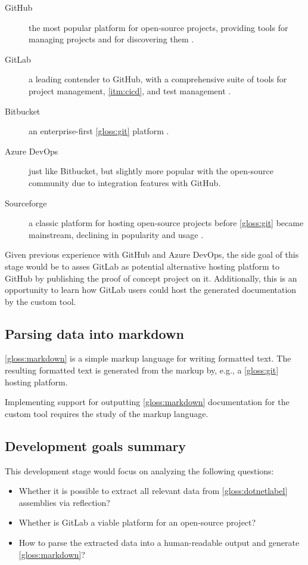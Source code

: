 \begin{description}
    \item[GitHub] the most popular platform for open-source projects, providing tools for managing projects and for discovering them \cite{gumster_6_2018}.
    \item[GitLab] a leading contender to GitHub, with a comprehensive suite of tools for project management, \ref{itm:cicd}, and test management \cite{gumster_6_2018}.
    \item[Bitbucket] an enterprise-first \ref{gloss:git} platform \cite{gumster_6_2018}.
    \item[Azure DevOps] just like Bitbucket, but slightly more popular with the open-source community due to integration features with GitHub.
    \item[Sourceforge] a classic platform for hosting open-source projects before \ref{gloss:git} became mainstream, declining in popularity and usage \cite{gumster_6_2018}.
\end{description}

Given previous experience with GitHub and Azure DevOps, the side goal of this stage would be to asses GitLab as potential alternative hosting platform to GitHub by publishing the proof of concept project on it. Additionally, this is an opportunity to learn how GitLab users could host the generated documentation by the custom tool.

\subsection{Parsing data into markdown}
\ref{gloss:markdown} is a simple markup language for writing formatted text. The resulting formatted text is generated from the markup by, e.g., a \ref{gloss:git} hosting platform.

Implementing support for outputting \ref{gloss:markdown} documentation for the custom tool requires the study of the markup language.

\subsection{Development goals summary}
This development stage would focus on analyzing the following questions:
\begin{itemize}
    \item Whether it is possible to extract all relevant data from \ref{gloss:dotnetlabel} assemblies via reflection?
    \item Whether is GitLab a viable platform for an open-source project?
    \item How to parse the extracted data into a human-readable output and generate \ref{gloss:markdown}?
\end{itemize}

